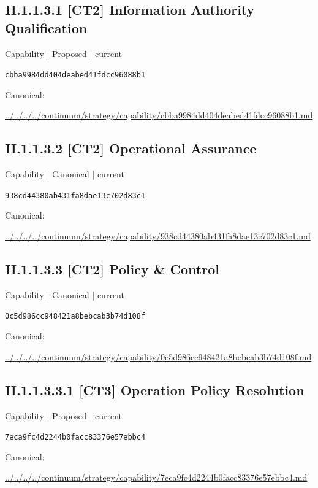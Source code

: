 \documentclass[10pt,a4paper]{article}
\begin{document}
\subsection*{II.1.1.3.1 [CT2] Information Authority Qualification}
{\small Capability | Proposed | current}\par
\texttt{cbba9984dd404deabed41fdcc96088b1}\par
Canonical: \par
{\footnotesize\url{../../../../continuum/strategy/capability/cbba9984dd404deabed41fdcc96088b1.md}}\par
\subsection*{II.1.1.3.2 [CT2] Operational Assurance}
{\small Capability | Canonical | current}\par
\texttt{938cd44380ab431fa8dae13c702d83c1}\par
Canonical: \par
{\footnotesize\url{../../../../continuum/strategy/capability/938cd44380ab431fa8dae13c702d83c1.md}}\par
\subsection*{II.1.1.3.3 [CT2] Policy \& Control}
{\small Capability | Canonical | current}\par
\texttt{0c5d986cc948421a8bebcab3b74d108f}\par
Canonical: \par
{\footnotesize\url{../../../../continuum/strategy/capability/0c5d986cc948421a8bebcab3b74d108f.md}}\par
\subsection*{II.1.1.3.3.1 [CT3] Operation Policy Resolution}
{\small Capability | Proposed | current}\par
\texttt{7eca9fc4d2244b0facc83376e57ebbc4}\par
Canonical: \par
{\footnotesize\url{../../../../continuum/strategy/capability/7eca9fc4d2244b0facc83376e57ebbc4.md}}\par
\end{document}
